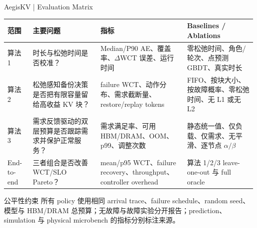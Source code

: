 \begin{frame}{AegisKV | Evaluation Matrix}
  \scriptsize
  \renewcommand{\arraystretch}{1.14}
  \begin{tabularx}{\textwidth}{p{}p{}p{}X}
    \toprule
    范围 & 主要问题 & 指标 & Baselines / Ablations \\
    \midrule
    算法 1
      & 时长与松弛时间是否校准？
      & Median/P90 AE、覆盖率、$\Delta$WCT 误差、运行时间
      & 零松弛时间、角色/轮次、点预测 GBDT、真实时长 \\
    算法 2
      & 松弛感知备份决策是否把有限容量留给高收益 KV 块？
      & failure WCT、动作分布、需求截断量、restore/replay tokens
      & FIFO、按块大小、按故障概率、零松弛时间、无 L1 或无 L2 \\
    算法 3
      & 需求反馈驱动的双层预算是否跟踪需求并保护正常服务？
      & 需求满足率、可用 HBM/DRAM、OOM、p99、调整次数
      & 静态统一值、仅负载、仅需求、无平滑、逐节点 $\alpha/\beta$ \\
    End-to-end
      & 三者组合是否改善 WCT/SLO Pareto？
      & mean/p95 WCT、failure recovery、throughput、controller overhead
      & 算法 1/2/3 leave-one-out 与 full oracle \\
    \bottomrule
  \end{tabularx}

  \vspace{0.11cm}
  \begin{block}{公平性约束}
    \footnotesize
    所有 policy 使用相同 arrival trace、failure schedule、random seed、模型与
    HBM/DRAM 总预算；无故障与故障实验分开报告；prediction、simulation 与
    physical microbench 的指标分别标注来源。
  \end{block}
\end{frame}

